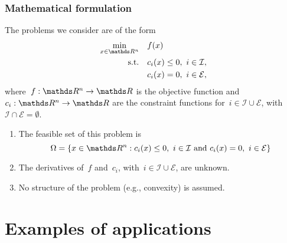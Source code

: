 \documentclass{polyu-presentation}
\newcommand{\con}[1]{c_{#1}}
\newcommand{\ieq}{\mathcal{E}}
\newcommand{\iub}{\mathcal{I}}
\newcommand{\obj}{f}
\begin{document}
\begin{frame}
    \frametitle{Mathematical formulation}

    The problems we consider are of the form
    \begin{align*}
        \min_{x \in \R^n}   & \quad \obj(x)\\
        \mathrm{s.t.}       & \quad \con{i}(x) \le 0, ~ i \in \iub,\\
                            & \quad \con{i}(x) = 0, ~ i \in \ieq,
    \end{align*}
    where~$\obj : \R^n \to \R$ is the \alert{objective function} and~$\con{i} : \R^n \to \R$ are the \alert{constraint functions} for~$i \in \iub \cup \ieq$, with~$\iub \cap \ieq = \emptyset$.

    \bigskip

    \begin{block}{}
        \begin{enumerate}
            \item The \alert{feasible set} of this problem is
            \begin{equation*}
                \Omega = \set{x \in \R^n : \con{i}(x) \le 0, ~ i \in \iub ~ \mathrm{and} ~ \con{i}(x) = 0, ~ i \in \ieq}
            \end{equation*}
            \item The derivatives of~$\obj$ and~$\con{i}$, with~$i \in \iub \cup \ieq$, are \alert{unknown}.
            \item \alert{No structure} of the problem (e.g., convexity) is assumed.
        \end{enumerate}
    \end{block}
\end{frame}

\section{Examples of applications}
\end{document}
